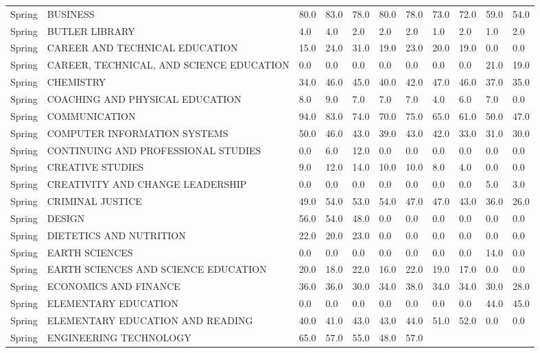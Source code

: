 \documentclass{article}
\begin{document}
\begin{longtable}[]{|l|p{4cm}|p{0.8cm}|p{0.8cm}|p{0.8cm}|p{0.8cm}|p{0.8cm}|p{0.8cm}|p{0.8cm}|p{0.8cm}|p{0.8cm}|}
Spring & BUSINESS & 80.0 & 83.0 & 78.0 & 80.0 & 78.0 & 73.0 & 72.0 &
59.0 & 54.0 \\
Spring & BUTLER LIBRARY & 4.0 & 4.0 & 2.0 & 2.0 & 2.0 & 1.0 & 2.0 & 1.0
& 2.0 \\
Spring & CAREER AND TECHNICAL EDUCATION & 15.0 & 24.0 & 31.0 & 19.0 &
23.0 & 20.0 & 19.0 & 0.0 & 0.0 \\
Spring & CAREER, TECHNICAL, AND SCIENCE EDUCATION & 0.0 & 0.0 & 0.0 &
0.0 & 0.0 & 0.0 & 0.0 & 21.0 & 19.0 \\
Spring & CHEMISTRY & 34.0 & 46.0 & 45.0 & 40.0 & 42.0 & 47.0 & 46.0 &
37.0 & 35.0 \\
Spring & COACHING AND PHYSICAL EDUCATION & 8.0 & 9.0 & 7.0 & 7.0 & 7.0 &
4.0 & 6.0 & 7.0 & 0.0 \\
Spring & COMMUNICATION & 94.0 & 83.0 & 74.0 & 70.0 & 75.0 & 65.0 & 61.0
& 50.0 & 47.0 \\
Spring & COMPUTER INFORMATION SYSTEMS & 50.0 & 46.0 & 43.0 & 39.0 & 43.0
& 42.0 & 33.0 & 31.0 & 30.0 \\
Spring & CONTINUING AND PROFESSIONAL STUDIES & 0.0 & 6.0 & 12.0 & 0.0 &
0.0 & 0.0 & 0.0 & 0.0 & 0.0 \\
Spring & CREATIVE STUDIES & 9.0 & 12.0 & 14.0 & 10.0 & 10.0 & 8.0 & 4.0
& 0.0 & 0.0 \\
Spring & CREATIVITY AND CHANGE LEADERSHIP & 0.0 & 0.0 & 0.0 & 0.0 & 0.0
& 0.0 & 0.0 & 5.0 & 3.0 \\
Spring & CRIMINAL JUSTICE & 49.0 & 54.0 & 53.0 & 54.0 & 47.0 & 47.0 &
43.0 & 36.0 & 26.0 \\
Spring & DESIGN & 56.0 & 54.0 & 48.0 & 0.0 & 0.0 & 0.0 & 0.0 & 0.0 &
0.0 \\
Spring & DIETETICS AND NUTRITION & 22.0 & 20.0 & 23.0 & 0.0 & 0.0 & 0.0
& 0.0 & 0.0 & 0.0 \\
Spring & EARTH SCIENCES & 0.0 & 0.0 & 0.0 & 0.0 & 0.0 & 0.0 & 0.0 & 14.0
& 0.0 \\
Spring & EARTH SCIENCES AND SCIENCE EDUCATION & 20.0 & 18.0 & 22.0 &
16.0 & 22.0 & 19.0 & 17.0 & 0.0 & 0.0 \\
Spring & ECONOMICS AND FINANCE & 36.0 & 36.0 & 30.0 & 34.0 & 38.0 & 34.0
& 34.0 & 30.0 & 28.0 \\
Spring & ELEMENTARY EDUCATION & 0.0 & 0.0 & 0.0 & 0.0 & 0.0 & 0.0 & 0.0
& 44.0 & 45.0 \\
Spring & ELEMENTARY EDUCATION AND READING & 40.0 & 41.0 & 43.0 & 43.0 &
44.0 & 51.0 & 52.0 & 0.0 & 0.0 \\
Spring & ENGINEERING TECHNOLOGY & 65.0 & 57.0 & 55.0 & 48.0 & 57.0 &

\end{longtable}
\end{document}
